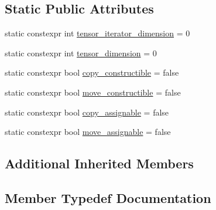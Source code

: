 \subsection*{Static Public Attributes}
\begin{DoxyCompactItemize}
\item 
static constexpr int \hyperlink{structBC_1_1tensors_1_1exprs_1_1Constexpr__Scalar__Constant_3_01Value_00_01Scalar_00_01BC_1_1host__tag_01_4_a200821c3055af0e6276199660bd60014}{tensor\+\_\+iterator\+\_\+dimension} = 0
\item 
static constexpr int \hyperlink{structBC_1_1tensors_1_1exprs_1_1Constexpr__Scalar__Constant_3_01Value_00_01Scalar_00_01BC_1_1host__tag_01_4_a6c6900dd72a7e32234792c768f6ca18e}{tensor\+\_\+dimension} = 0
\item 
static constexpr bool \hyperlink{structBC_1_1tensors_1_1exprs_1_1Constexpr__Scalar__Constant_3_01Value_00_01Scalar_00_01BC_1_1host__tag_01_4_ae46a8cb8f7bd1310fee8a0ecfa04bc77}{copy\+\_\+constructible} = false
\item 
static constexpr bool \hyperlink{structBC_1_1tensors_1_1exprs_1_1Constexpr__Scalar__Constant_3_01Value_00_01Scalar_00_01BC_1_1host__tag_01_4_a1cdd7600a3747f35affc20ee1553e9bd}{move\+\_\+constructible} = false
\item 
static constexpr bool \hyperlink{structBC_1_1tensors_1_1exprs_1_1Constexpr__Scalar__Constant_3_01Value_00_01Scalar_00_01BC_1_1host__tag_01_4_a418267687dadd6933c131b4369bff3df}{copy\+\_\+assignable} = false
\item 
static constexpr bool \hyperlink{structBC_1_1tensors_1_1exprs_1_1Constexpr__Scalar__Constant_3_01Value_00_01Scalar_00_01BC_1_1host__tag_01_4_a555f9f25ce4a64f466aa9d0828a1b66a}{move\+\_\+assignable} = false
\end{DoxyCompactItemize}
\subsection*{Additional Inherited Members}


\subsection{Member Typedef Documentation}
